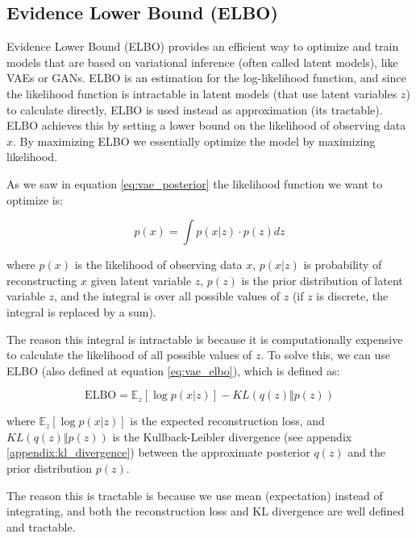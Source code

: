 \subsection{Evidence Lower Bound (ELBO)}
\label{appendix:elbo}

Evidence Lower Bound (ELBO) provides an efficient way to optimize and train models that are based on variational inference (often called latent models), like VAEs or GANs. ELBO is an estimation for the log-likelihood function, and since the likelihood function is intractable in latent models (that use latent variables $z$) to calculate directly, ELBO is used instead as approximation (its tractable). ELBO achieves this by setting a lower bound on the likelihood of observing data $x$. By maximizing ELBO we essentially optimize the model by maximizing likelihood.

As we saw in equation \ref{eq:vae_posterior} the likelihood function we want to optimize is:

\begin{equation}
    p(x) = \int p(x | z) \cdot p(z) dz
\end{equation}

where $p(x)$ is the likelihood of observing data $x$, $p(x | z)$ is probability of reconstructing $x$ given latent variable $z$,  $p(z)$ is the prior distribution of latent variable $z$, and the integral is over all possible values of $z$ (if $z$ is discrete, the integral is replaced by a sum).

The reason this integral is intractable is because it is computationally expensive to calculate the likelihood of all possible values of $z$. To solve this, we can use ELBO (also defined at equation \ref{eq:vae_elbo}), which is defined as:

\begin{equation}
    \text{ELBO} = \mathbb{E}_z[\log p(x | z)] - KL(q(z) \Vert p(z))
    \label{eq:elbo}
\end{equation}

where $\mathbb{E}_z[\log p(x | z)]$ is the expected reconstruction loss, and $KL(q(z) \Vert p(z))$ is the Kullback-Leibler divergence (see appendix \ref{appendix:kl_divergence}) between the approximate posterior $q(z)$ and the prior distribution $p(z)$.

The reason this is tractable is because we use mean (expectation) instead of integrating, and both the reconstruction loss and KL divergence are well defined and tractable. 
